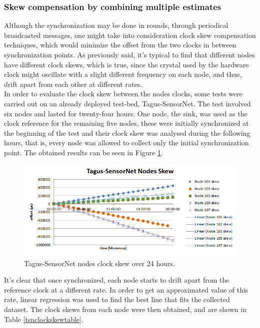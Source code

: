 \subsubsection{Skew compensation by combining multiple estimates}
Although the synchronization may be done in rounds, through periodical broadcasted messages, one might take into consideration clock skew compensation techniques, which would minimize the offset from the two clocks in between synchronization points. As previously said, it's typical to find that different nodes have different clock skews, which is true, since the crystal used by the hardware clock might oscillate with a slight different frequency on each node, and thus, drift apart from each other at different rates.\\
In order to evaluate the clock skew between the nodes clocks, some tests were carried out on an already deployed test-bed, Tagus-SensorNet. The test involved six nodes and lasted for twenty-four hours. One node, the sink, was used as the clock reference for the remaining five nodes, these were initially synchronized at the beginning of the test and their clock skew was analysed during the following hours, that is, every node was allowed to collect only the initial synchronization point. The obtained results can be seen in Figure \ref{tsnclockskewchart}.\\

\begin{figure}[!htb]
\begin{center}
\includegraphics[scale=0.5]{./images/07-ttsp-tsn_skew.png}
\end{center}
\caption{Tagus-SensorNet nodes clock skew over 24 hours.}
\label{tsnclockskewchart}
\end{figure}

It's clear that once synchronized, each node starts to drift apart from the reference clock at a different rate. In order to get an approximated value of this rate, linear regression was used to find the best line that fits the collected dataset. The clock skews from each node were then obtained, and are shown in Table \ref{tsnclockskewtable}. 

